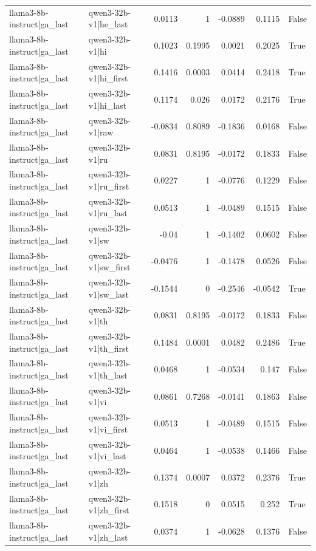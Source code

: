 \begin{table}
\begin{tabular}{l l r r r r l}
llama3-8b-instruct|ga_last & qwen3-32b-v1|he_last & 0.0113 & 1 & -0.0889 & 0.1115 & False \\
llama3-8b-instruct|ga_last & qwen3-32b-v1|hi & 0.1023 & 0.1995 & 0.0021 & 0.2025 & True \\
llama3-8b-instruct|ga_last & qwen3-32b-v1|hi_first & 0.1416 & 0.0003 & 0.0414 & 0.2418 & True \\
llama3-8b-instruct|ga_last & qwen3-32b-v1|hi_last & 0.1174 & 0.026 & 0.0172 & 0.2176 & True \\
llama3-8b-instruct|ga_last & qwen3-32b-v1|raw & -0.0834 & 0.8089 & -0.1836 & 0.0168 & False \\
llama3-8b-instruct|ga_last & qwen3-32b-v1|ru & 0.0831 & 0.8195 & -0.0172 & 0.1833 & False \\
llama3-8b-instruct|ga_last & qwen3-32b-v1|ru_first & 0.0227 & 1 & -0.0776 & 0.1229 & False \\
llama3-8b-instruct|ga_last & qwen3-32b-v1|ru_last & 0.0513 & 1 & -0.0489 & 0.1515 & False \\
llama3-8b-instruct|ga_last & qwen3-32b-v1|sw & -0.04 & 1 & -0.1402 & 0.0602 & False \\
llama3-8b-instruct|ga_last & qwen3-32b-v1|sw_first & -0.0476 & 1 & -0.1478 & 0.0526 & False \\
llama3-8b-instruct|ga_last & qwen3-32b-v1|sw_last & -0.1544 & 0 & -0.2546 & -0.0542 & True \\
llama3-8b-instruct|ga_last & qwen3-32b-v1|th & 0.0831 & 0.8195 & -0.0172 & 0.1833 & False \\
llama3-8b-instruct|ga_last & qwen3-32b-v1|th_first & 0.1484 & 0.0001 & 0.0482 & 0.2486 & True \\
llama3-8b-instruct|ga_last & qwen3-32b-v1|th_last & 0.0468 & 1 & -0.0534 & 0.147 & False \\
llama3-8b-instruct|ga_last & qwen3-32b-v1|vi & 0.0861 & 0.7268 & -0.0141 & 0.1863 & False \\
llama3-8b-instruct|ga_last & qwen3-32b-v1|vi_first & 0.0513 & 1 & -0.0489 & 0.1515 & False \\
llama3-8b-instruct|ga_last & qwen3-32b-v1|vi_last & 0.0464 & 1 & -0.0538 & 0.1466 & False \\
llama3-8b-instruct|ga_last & qwen3-32b-v1|zh & 0.1374 & 0.0007 & 0.0372 & 0.2376 & True \\
llama3-8b-instruct|ga_last & qwen3-32b-v1|zh_first & 0.1518 & 0 & 0.0515 & 0.252 & True \\
llama3-8b-instruct|ga_last & qwen3-32b-v1|zh_last & 0.0374 & 1 & -0.0628 & 0.1376 & False \\

\end{tabular}
\end{table}
